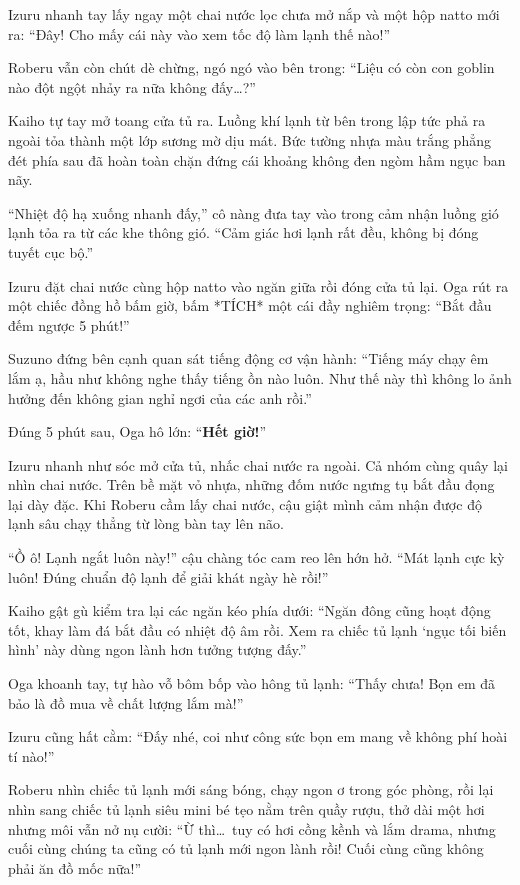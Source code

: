 \documentclass[../main.tex]{subfiles}
\begin{document}
Izuru nhanh tay lấy ngay một chai nước lọc chưa mở nắp và một hộp natto mới ra: ``Đây! Cho mấy cái này vào xem tốc độ làm lạnh thế nào!''

Roberu vẫn còn chút dè chừng, ngó ngó vào bên trong: ``Liệu có còn con goblin nào đột ngột nhảy ra nữa không đấy\dots?''

Kaiho tự tay mở toang cửa tủ ra. Luồng khí lạnh từ bên trong lập tức phả ra ngoài tỏa thành một lớp sương mờ dịu mát. Bức tường nhựa màu trắng phẳng đét phía sau đã hoàn toàn chặn đứng cái khoảng không đen ngòm hầm ngục ban nãy.

``Nhiệt độ hạ xuống nhanh đấy,'' cô nàng đưa tay vào trong cảm nhận luồng gió lạnh tỏa ra từ các khe thông gió. ``Cảm giác hơi lạnh rất đều, không bị đóng tuyết cục bộ.''

Izuru đặt chai nước cùng hộp natto vào ngăn giữa rồi đóng cửa tủ lại. Oga rút ra một chiếc đồng hồ bấm giờ, bấm *TÍCH* một cái đầy nghiêm trọng: ``Bắt đầu đếm ngược 5 phút!''

Suzuno đứng bên cạnh quan sát tiếng động cơ vận hành: ``Tiếng máy chạy êm lắm ạ, hầu như không nghe thấy tiếng ồn nào luôn. Như thế này thì không lo ảnh hưởng đến không gian nghỉ ngơi của các anh rồi.''

Đúng 5 phút sau, Oga hô lớn: ``\textbf{Hết giờ!}''

Izuru nhanh như sóc mở cửa tủ, nhấc chai nước ra ngoài. Cả nhóm cùng quây lại nhìn chai nước. Trên bề mặt vỏ nhựa, những đốm nước ngưng tụ bắt đầu đọng lại dày đặc. Khi Roberu cầm lấy chai nước, cậu giật mình cảm nhận được độ lạnh sâu chạy thẳng từ lòng bàn tay lên não.

``Ồ ô! Lạnh ngắt luôn này!'' cậu chàng tóc cam reo lên hớn hở. ``Mát lạnh cực kỳ luôn! Đúng chuẩn độ lạnh để giải khát ngày hè rồi!''

Kaiho gật gù kiểm tra lại các ngăn kéo phía dưới: ``Ngăn đông cũng hoạt động tốt, khay làm đá bắt đầu có nhiệt độ âm rồi. Xem ra chiếc tủ lạnh `ngục tối biến hình' này dùng ngon lành hơn tưởng tượng đấy.''

Oga khoanh tay, tự hào vỗ bôm bốp vào hông tủ lạnh: ``Thấy chưa! Bọn em đã bảo là đồ mua về chất lượng lắm mà!''

Izuru cũng hất cằm: ``Đấy nhé, coi như công sức bọn em mang về không phí hoài tí nào!''

Roberu nhìn chiếc tủ lạnh mới sáng bóng, chạy ngon ơ trong góc phòng, rồi lại nhìn sang chiếc tủ lạnh siêu mini bé tẹo nằm trên quầy rượu, thở dài một hơi nhưng môi vẫn nở nụ cười: ``Ừ thì\dots\ tuy có hơi cồng kềnh và lắm drama, nhưng cuối cùng chúng ta cũng có tủ lạnh mới ngon lành rồi! Cuối cùng cũng không phải ăn đồ mốc nữa!''
\end{document}
